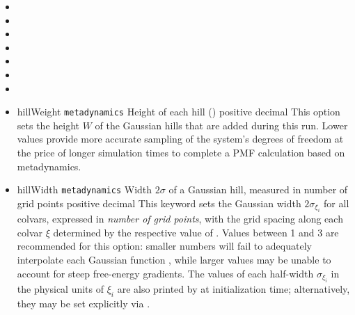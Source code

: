 \begin{itemize}

\item {}
\item {}
\item {}
\item {}
\item {}
\item {}
\item {}

\item %
  \key
    {hillWeight}{%
    \texttt{metadynamics}}{%
    Height of each hill ()}{%
    positive decimal}{%
    This option sets the height $W$ of the Gaussian hills that are added during this run.
    Lower values provide more accurate sampling of the system's degrees of freedom at the price of longer simulation times to complete a PMF calculation based on metadynamics.}

\item %
  \key
    {hillWidth}{%
    \texttt{metadynamics}}{%
    Width $2\sigma$ of a Gaussian hill, measured in number of grid points}{%
    positive decimal}{%
    This keyword sets the Gaussian width $2\sigma_{\xi_{i}}$ for all colvars, expressed in \emph{number of grid points}, with the grid spacing along each colvar $\xi$ determined by the respective value of .
    Values between 1 and 3 are recommended for this option: smaller numbers will fail to adequately interpolate each Gaussian function \cite{Fiorin2013}, while larger values may be unable to account for steep free-energy gradients.
    The values of each half-width $\sigma_{\xi_{i}}$ in the physical units of $\xi_{i}$ are also printed by \MDENGINE{} at initialization time; alternatively, they may be set explicitly via .
    }


\end{itemize}
